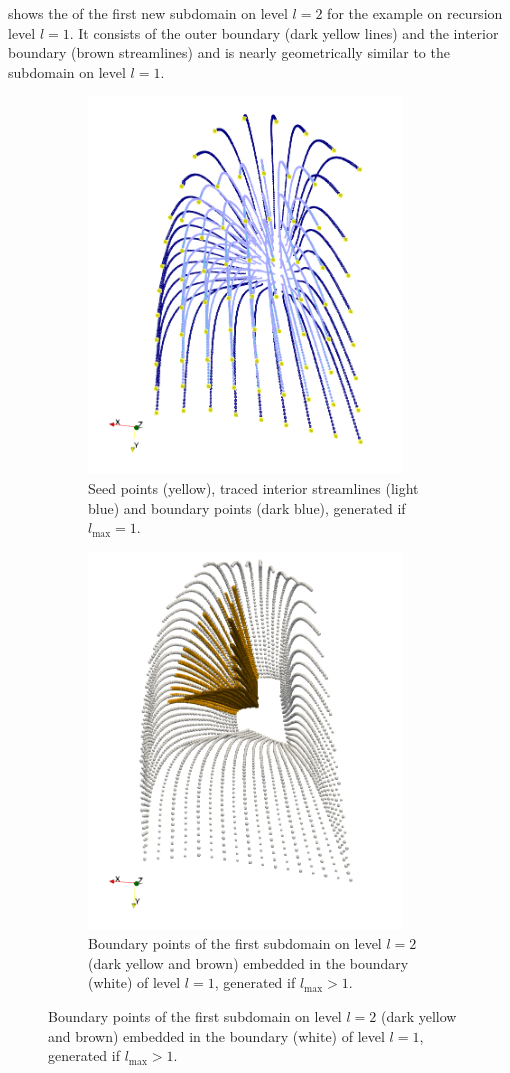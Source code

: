 shows the  of the first new subdomain on level $l=2$ for the example on recursion level $l=1$. It consists of the outer boundary (dark yellow lines) and the interior boundary (brown streamlines) and is nearly geometrically similar to the subdomain on level $l=1$. 

\begin{figure}%
  \centering%
  \begin{subfigure}[t]{0.48\textwidth}%
    \centering%
    \includegraphics[height=10cm]{images/parallel_fiber_estimation/08_final.png}
    \caption{Seed points (yellow), traced interior streamlines (light blue) and boundary points (dark blue), generated if $l_\text{max}=1$.}%
    \label{fig:08_final}%
  \end{subfigure}
  \quad   
  \begin{subfigure}[t]{0.48\textwidth}%
    \centering%
    \includegraphics[height=10cm]{images/parallel_fiber_estimation/06_subdomain.png}
    \caption{Boundary points of the first subdomain on level $l=2$ (dark yellow and brown) embedded in the boundary (white) of level $l=1$, generated if $l_\text{max} > 1$.}%
    \label{fig:06_subdomain}%
  \end{subfigure}
   

\end{figure}
